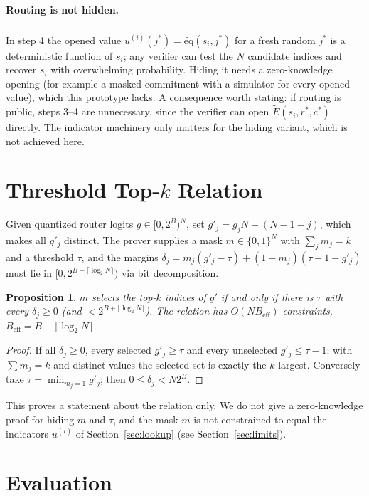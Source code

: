 \documentclass[10pt,twocolumn]{article}
\newtheorem{proposition}{Proposition}
\newcommand{\eq}{\widetilde{\mathrm{eq}}}
\begin{document}
\paragraph{Routing is not hidden.} In step 4 the opened value $\widetilde{u^{(i)}}(j^*)=\eq(s_i,j^*)$ for a fresh random $j^*$ is a deterministic function of $s_i$; any verifier can test the $N$ candidate indices and recover $s_i$ with overwhelming probability. Hiding it needs a zero-knowledge opening (for example a masked commitment with a simulator for every opened value), which this prototype lacks. A consequence worth stating: if routing is public, steps 3--4 are unnecessary, since the verifier can open $\widetilde E(s_i,r^*,c^*)$ directly. The indicator machinery only matters for the hiding variant, which is not achieved here.

\section{Threshold Top-$k$ Relation}
\label{sec:router}
Given quantized router logits $g\in[0,2^B)^N$, set $g'_j=g_jN+(N-1-j)$, which makes all $g'_j$ distinct. The prover supplies a mask $m\in\{0,1\}^N$ with $\sum_jm_j=k$ and a threshold $\tau$, and the margins $\delta_j=m_j(g'_j-\tau)+(1-m_j)(\tau-1-g'_j)$ must lie in $[0,2^{B+\lceil\log_2N\rceil})$ via bit decomposition.

\begin{proposition}
\label{prop:router}
$m$ selects the top-$k$ indices of $g'$ if and only if there is $\tau$ with every $\delta_j\ge 0$ (and $<2^{B+\lceil\log_2N\rceil}$). The relation has $O(NB_{\text{eff}})$ constraints, $B_{\text{eff}}=B+\lceil\log_2N\rceil$.
\end{proposition}
\begin{proof}
If all $\delta_j\ge0$, every selected $g'_j\ge\tau$ and every unselected $g'_j\le\tau-1$; with $\sum m_j=k$ and distinct values the selected set is exactly the $k$ largest. Conversely take $\tau=\min_{m_j=1}g'_j$; then $0\le\delta_j<N2^B$.
\end{proof}
This proves a statement about the relation only. We do not give a zero-knowledge proof for hiding $m$ and $\tau$, and the mask $m$ is not constrained to equal the indicators $u^{(i)}$ of Section~\ref{sec:lookup} (see Section~\ref{sec:limits}).

\section{Evaluation}
\label{sec:eval}
\end{document}
